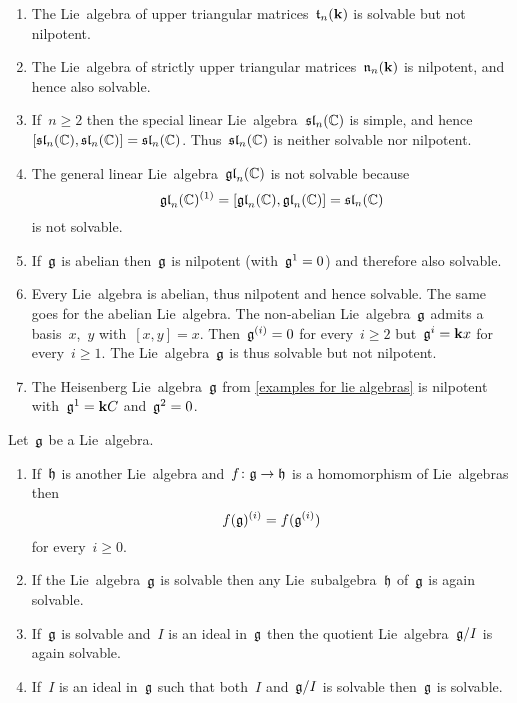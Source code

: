 \begin{examples}
  \label{examples for solvable and nilpotent}
  \leavevmode
  \begin{enumerate}
    \item
      The Lie~algebra of upper triangular matrices~$\mathfrak{t}_n(\mathbf{k})$ is solvable but not nilpotent.
    \item
      The Lie~algebra of strictly upper triangular matrices~$\mathfrak{n}_n(\mathbf{k})$ is nilpotent, and hence also solvable.
    \item
      If~$n \geq 2$ then the special linear Lie~algebra~$\mathfrak{sl}_n(\mathbb{C})$ is simple, and hence~$[\mathfrak{sl}_n(\mathbb{C}), \mathfrak{sl}_n(\mathbb{C})] = \mathfrak{sl}_n(\mathbb{C})$.
      Thus~$\mathfrak{sl}_n(\mathbb{C})$ is neither solvable nor nilpotent.
    \item
      The general linear Lie~algebra~$\mathfrak{gl}_n(\mathbb{C})$ is not solvable because
      \[
        \mathfrak{gl}_n(\mathbb{C})^{(1)}
        =
        [\mathfrak{gl}_n(\mathbb{C}), \mathfrak{gl}_n(\mathbb{C})]
        =
        \mathfrak{sl}_n(\mathbb{C})
      \]
      is not solvable.
    \item
      If~$\mathfrak{g}$ is abelian then~$\mathfrak{g}$ is nilpotent (with~$\mathfrak{g}^1 = 0$) and therefore also solvable.
    \item
      Every {\onedimensional} Lie~algebra is abelian, thus nilpotent and hence solvable.
      The same goes for the {\twodimensional} abelian Lie~algebra.
      The {\twodimensional} non-abelian Lie~algebra~$\mathfrak{g}$ admits a basis~$x$,~$y$ with~$[x,y] = x$.
      Then~$\mathfrak{g}^{(i)} = 0$ for every~$i \geq 2$ but~$\mathfrak{g}^i = \mathbf{k} x$ for every~$i \geq 1$.
      The Lie~algebra~$\mathfrak{g}$ is thus solvable but not nilpotent.
    \item
      The Heisenberg Lie~algebra~$\mathfrak{g}$ from \cref{examples for lie algebras} is nilpotent with~$\mathfrak{g}^1 = \mathbf{k} C$ and~$\mathfrak{g}^2 = 0$.
  \end{enumerate}
\end{examples}


\begin{proposition}
  \label{properties of solvable and nilpotent}
  Let~$\mathfrak{g}$ be a Lie~algebra.
  \begin{enumerate}
    \item
      If~$\mathfrak{h}$ is another Lie~algebra and~$f \colon \mathfrak{g} \to \mathfrak{h}$ is a homomorphism of Lie~algebras then
      \[
        f(\mathfrak{g})^{(i)}
        =
        f(\mathfrak{g}^{(i)})
      \]
      for every~$i \geq 0$.
    \item
      If the Lie~algebra~$\mathfrak{g}$ is solvable then any Lie~subalgebra~$\mathfrak{h}$ of~$\mathfrak{g}$ is again solvable.
    \item
      If~$\mathfrak{g}$ is solvable and~$I$ is an ideal in~$\mathfrak{g}$ then the quotient Lie~algebra~$\mathfrak{g}/I$ is again solvable.
    \item
      If~$I$ is an ideal in~$\mathfrak{g}$ such that both~$I$ and~$\mathfrak{g}/I$ is solvable then~$\mathfrak{g}$ is solvable.
  \end{enumerate}
\end{proposition}


